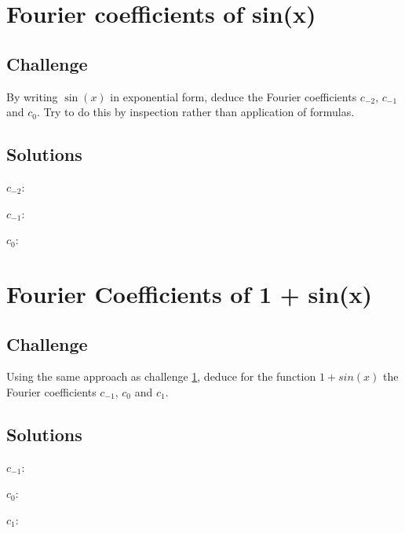 \section{Fourier coefficients of sin(x)}
\label{sec:fcsinx}

\subsection*{Challenge}
By writing $\sin(x)$ in exponential form, deduce the Fourier coefficients $c_{-2}$, $c_{-1}$ and $c_0$. Try to do this by inspection rather than application of formulas.

\subsection*{Solutions}
$c_{-2}$:\\

$c_{-1}$:\\

$c_0$:\\




\newpage

\section{Fourier Coefficients of 1 + sin(x)}
\label{sec:fcsinxp1}

\subsection*{Challenge}
Using the same approach as challenge \ref{sec:fcsinx}, deduce for the function $1+sin(x)$ the Fourier coefficients $c_{-1}$, $c_0$ and $c_1$.

\subsection*{Solutions}
$c_{-1}$:\\

$c_0$:\\

$c_1$:\\






